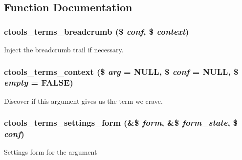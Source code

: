 \subsection{Function Documentation}
\hypertarget{arguments_2terms_8inc_ad3e0d214b216c57818de2686f549eeaa}{
\subsubsection[{ctools\_\-terms\_\-breadcrumb}]{\setlength{\rightskip}{0pt plus 5cm}ctools\_\-terms\_\-breadcrumb (\$ {\em conf}, \/  \$ {\em context})}}
\label{arguments_2terms_8inc_ad3e0d214b216c57818de2686f549eeaa}
Inject the breadcrumb trail if necessary. \hypertarget{arguments_2terms_8inc_adbd3f90249294bc22390c17da70d3944}{
\subsubsection[{ctools\_\-terms\_\-context}]{\setlength{\rightskip}{0pt plus 5cm}ctools\_\-terms\_\-context (\$ {\em arg} = {\ttfamily NULL}, \/  \$ {\em conf} = {\ttfamily NULL}, \/  \$ {\em empty} = {\ttfamily FALSE})}}
\label{arguments_2terms_8inc_adbd3f90249294bc22390c17da70d3944}
Discover if this argument gives us the term we crave. \hypertarget{arguments_2terms_8inc_a351acc9b20f57b14827cb63e3eb73088}{
\subsubsection[{ctools\_\-terms\_\-settings\_\-form}]{\setlength{\rightskip}{0pt plus 5cm}ctools\_\-terms\_\-settings\_\-form (\&\$ {\em form}, \/  \&\$ {\em form\_\-state}, \/  \$ {\em conf})}}
\label{arguments_2terms_8inc_a351acc9b20f57b14827cb63e3eb73088}
Settings form for the argument 

